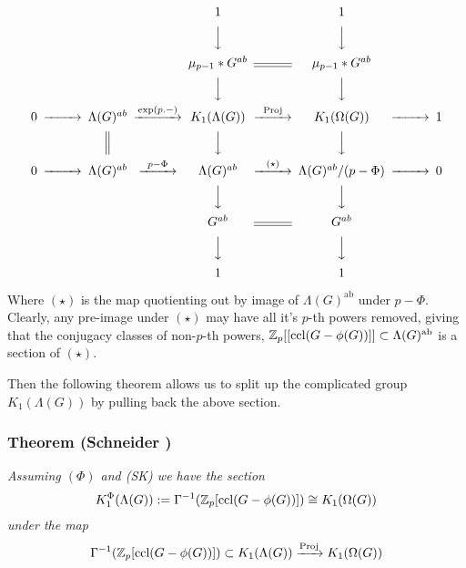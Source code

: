 


$$\begin{CD}
 			&&&&1           &    &    1\\
			&&&&@VVV                @VVV\\
			&&&&\mu_{p-1} * G^{ab} @= \mu_{p-1} * G^{ab} \\
			&&&&@VVV                 @VVV\\
0 @>>> 	 \Lambda(G)^{ab} @>{\text{exp}(p.-)}>>		K_1(\Lambda(G)) @>{\text{Proj}}>> K_1(\Omega(G)) @>>> 1\\
			& & @| @VVV @VVV\\
0 @>>> \Lambda(G)^{ab} @>{p-\Phi}>> \Lambda(G)^{ab} @>{(\star)}>> \Lambda(G)^{ab}/(p-\Phi)  @>>> 0 \\
			&&&&@VVV @VVV\\
			&&&&G^{ab} @= G^{ab}\\
			&&&&@VVV @VVV\\
			&&&&1 & & 1
\end{CD}$$

Where $(\star)$ is the map quotienting out by image of $\Lambda(G)^{\text{ab}}$ under $p-\Phi$. Clearly, any pre-image under $(\star)$ may have all it's $p$-th powers removed, giving that the conjugacy classes of non-$p$-th powers, $\mathbb Z_p[[\text{ccl(} G-\phi(G))]] \subset \Lambda(G)^{\text{ab}}$ is a section of $(\star)$.

Then the following theorem allows us to split up the complicated group $K_1(\Lambda(G))$ by pulling back the above section.

\subsubsection*{Theorem (Schneider \cite{scneidericms})}
\emph{Assuming $(\Phi)$ and (SK) we have the section
$$K_1^{\Phi} (\Lambda(G)): = \Gamma^{-1} (\mathbb Z_p[\text{ccl(} G - \phi(G))]) \cong K_{1}(\Omega(G))$$ under the map
$$\Gamma^{-1} (\mathbb Z_p[\text{ccl(} G - \phi(G))]) \subset K_{1}(\Lambda(G))\xrightarrow{\text{Proj}} K_{1}(\Omega(G))$$}


